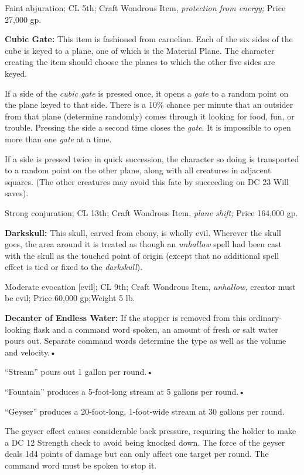 \documentclass{article}
\begin{document}
Faint abjuration; CL 5th; Craft Wondrous Item, \textit{protection from energy; 
}Price 27,000 gp.

\textbf{Cubic Gate: }This item is fashioned from carnelian. Each of the six sides 
of the cube is keyed to a plane, one of which is the Material Plane. The character 
creating the item should choose the planes to which the other five sides are keyed.

If a side of the \textit{cubic gate }is pressed once, it opens a \textit{gate }to 
a random point on the plane keyed to that side. There is a 10\% chance per minute 
that an outsider from that plane (determine randomly) comes through it looking 
for food, fun, or trouble. Pressing the side a second time closes the \textit{gate}. 
It is impossible to open more than one \textit{gate }at a time.

If a side is pressed twice in quick succession, the character so doing is transported 
to a random point on the other plane, along with all creatures in adjacent squares. 
(The other creatures may avoid this fate by succeeding on DC 23 Will saves).

Strong conjuration; CL 13th; Craft Wondrous Item, \textit{plane shift; }Price 164,000 
gp.

\textbf{Darkskull: }This skull, carved from ebony, is wholly evil. Wherever the 
skull goes, the area around it is treated as though an \textit{unhallow }spell 
had been cast with the skull as the touched point of origin (except that no additional 
spell effect is tied or fixed to the \textit{darkskull}).

Moderate evocation [evil]; CL 9th; Craft Wondrous Item, \textit{unhallow, }creator 
must be evil; Price 60,000 gp;Weight 5 lb.

\textbf{Decanter of Endless Water:} If the stopper is removed from this ordinary-looking 
flask and a command word spoken, an amount of fresh or salt water pours out. Separate 
command words determine the type as well as the volume and velocity.• 

\parindent=3pt
``Stream'' pours out 1 gallon per round.• 

``Fountain'' produces a 5-foot-long stream at 5 gallons per round.• 

\parindent=7pt
``Geyser'' produces a 20-foot-long, 1-foot-wide stream at 30 gallons per round.

\parindent=0pt
The geyser effect causes considerable back pressure, requiring the holder to make 
a DC 12 Strength check to avoid being knocked down. The force of the geyser deals 
1d4 points of damage but can only affect one target per round. The command word 
must be spoken to stop it.
\end{document}

